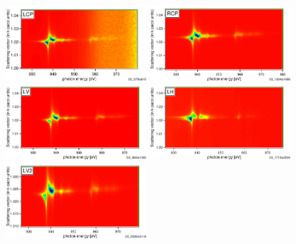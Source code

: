 \documentclass[twocolumn,amsmath,superscriptaddress,amssymb]{revtex4-1}
\begin{document}
\begin{figure}
	\begin{minipage}[tp]{0.45\columnwidth}
		\includegraphics[width = \textwidth, height = 2.8cm]{./RIXS/LCP.pdf}
	\end{minipage}
	\begin{minipage}[tp]{0.45\columnwidth}
		\includegraphics[width = \textwidth, height = 2.8cm]{./RIXS/RCP.pdf}
	\end{minipage}
	\begin{minipage}[tp]{0.45\columnwidth}
		\includegraphics[width = \textwidth, height = 2.8cm]{./RIXS/LV.pdf}
	\end{minipage}
	\begin{minipage}[tp]{0.45\columnwidth}
		\includegraphics[width = \textwidth, height = 2.8cm]{./RIXS/LH.pdf}
	\end{minipage}
	\begin{minipage}[tp]{0.45\columnwidth}
		\includegraphics[width = \textwidth, height = 2.8cm]{./RIXS/LV2.pdf}

\end{minipage}
\end{figure}
\end{document}
